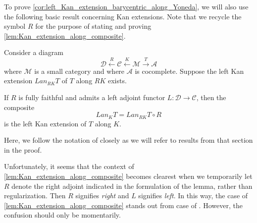 To prove \cref{cor:left_Kan_extension_barycentric_along_Yoneda}, we will also use the following basic result concerning Kan extensions. Note that we recycle the symbol $R$ for the purpose of stating and proving \cref{lem:Kan_extension_along_composite}.
\begin{lemma}\label{lem:Kan_extension_along_composite}
Consider a diagram
\[\mathscr{D} \xleftarrow{R} \mathscr{C} \xleftarrow{K} \mathscr{M} \xrightarrow{T} \mathscr{A}\]
where $\mathscr{M}$ is a small category and where $\mathscr{A}$ is cocomplete. Suppose the left Kan extension $Lan_{RK}T$ of $T$ along $RK$ exists.

If $R$ is fully faithful and admits a left adjoint functor $L:\mathscr{D} \to \mathscr{C}$, then the composite
\[Lan_KT=Lan_{RK}T\circ R\]
is the left Kan extension of $T$ along $K$.
\end{lemma}
\noindent Here, we follow the notation of \cite[§X]{ML98} closely as we will refer to results from that section in the proof.

Unfortunately, it seems that the context of \cref{lem:Kan_extension_along_composite} becomes clearest when we temporarily let $R$ denote the right adjoint indicated in the formulation of the lemma, rather than regularization. Then $R$ signifies \emph{right} and $L$ signifies \emph{left}. In this way, the case of \cref{lem:Kan_extension_along_composite} stands out from case of \cite[X.5~Thm.~1]{ML98}. However, the confusion should only be momentarily.

